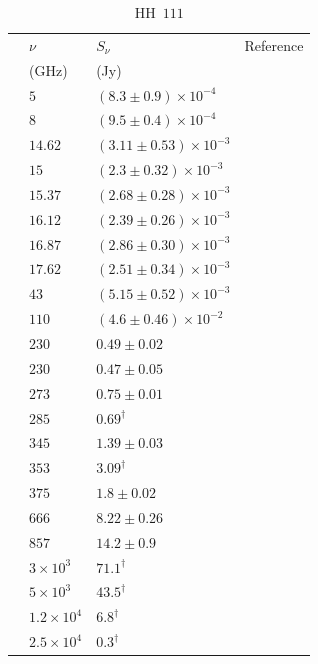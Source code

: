 \documentclass[9pt]{extarticle}   	%
\begin{document}
\begin{table}
\caption{HH~$111$}
\begin{center}
\begin{tabular}{llll}
\hline
 & $\nu$ & $S_\nu$ & Reference\\
 & (GHz) & (Jy) & \\
\hline
 & $5$ & $(8.3\pm0.9)\times10^{-4}$ & \citet{2008AJ....136.1852R}\\
 & $8$ & $(9.5\pm0.4)\times10^{-4}$ & \citet{1994AA...281..882R}\\
 & $14.62$ & $(3.11\pm0.53)\times10^{-3}$ & \citet{2012MNRAS.423.1089A}\\
 & $15$ & $(2.3\pm0.32)\times10^{-3}$ & \citet{1994AA...281..882R}\\
 & $15.37$ & $(2.68\pm0.28)\times10^{-3}$ & \citet{2012MNRAS.423.1089A}\\
 & $16.12$ & $(2.39\pm0.26)\times10^{-3}$ & \citet{2012MNRAS.423.1089A}\\
 & $16.87$ & $(2.86\pm0.30)\times10^{-3}$ & \citet{2012MNRAS.423.1089A}\\
 & $17.62$ & $(2.51\pm0.34)\times10^{-3}$ & \citet{2012MNRAS.423.1089A}\\
 & $43$ & $(5.15\pm0.52)\times10^{-3}$ & \citet{2008AJ....136.1852R}\\
 & $110$ & $(4.6\pm0.46)\times10^{-2}$ & \citet{1993ApJ...408..239S}\\
 & $230$ & $0.49\pm0.02$ & \citet{1993AA...273..221R}\\
 & $230$ & $0.47\pm0.05$ & \citet{1989ApJ...345..257W}\\
 & $273$ & $0.75\pm0.01$ & \citet{1998MNRAS.301.1049D}\\
 & $285$ & $0.69^{\dag}$ & \citet{1993ApJ...408..239S}\\
 & $345$ & $1.39\pm0.03$ & \citet{1993AA...273..221R}\\
 & $353$ & $3.09^{\dag}$ & \citet{2008ApJS..175..277D}\\
 & $375$ & $1.8\pm0.02$ & \citet{1998MNRAS.301.1049D}\\
 & $666$ & $8.22\pm0.26$ & \citet{1998MNRAS.301.1049D}\\
 & $857$ & $14.2\pm0.9$ & \citet{1998MNRAS.301.1049D}\\
 & $3\times10^{3}$ & $71.1^{\dag}$ & \citet{1993AA...273..221R}\\
 & $5\times10^{3}$ & $43.5^{\dag}$ & \citet{1993AA...273..221R}\\
 & $1.2\times10^{4}$ & $6.8^{\dag}$ & \citet{1993AA...273..221R}\\
 & $2.5\times10^{4}$ & $0.3^{\dag}$ & \citet{1993AA...273..221R}\\
\end{tabular}
\end{center}
\label{default}
\end{table}%
\end{document}
